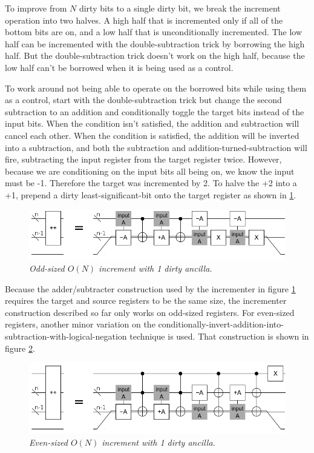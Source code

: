 \documentclass[twocolumn]{article}
\begin{document}
To improve from $N$ dirty bits to a single dirty bit, we break the increment operation into two halves.
A high half that is incremented only if all of the bottom bits are on, and a low half that is unconditionally incremented.
The low half can be incremented with the double-subtraction trick by borrowing the high half.
But the double-subtraction trick doesn't work on the high half, because the low half can't be borrowed when it is being used as a control.

To work around not being able to operate on the borrowed bits while using them as a control, start with the double-subtraction trick but change the second subtraction to an addition and conditionally toggle the target bits instead of the input bits.
When the condition isn't satisfied, the addition and subtraction will cancel each other.
When the condition is satisfied, the addition will be inverted into a subtraction, and both the subtraction and addition-turned-subtraction will fire, subtracting the input register from the target register twice.
However, because we are conditioning on the input bits all being on, we know the input must be -1.
Therefore the target was incremented by 2.
To halve the +2 into a +1, prepend a dirty least-significant-bit onto the target register as shown in \ref{fig:compact-increment}.

\begin{figure}
  \centering
  \includegraphics[totalheight=1.5cm]{compact-increment.png}
  \caption{\em Odd-sized $O(N)$ increment with 1 dirty ancilla.}
  \label{fig:compact-increment}
\end{figure}

Because the adder/subtracter construction used by the incrementer in figure \ref{fig:compact-increment} requires the target and source registers to be the same size, the incrementer construction described so far only works on odd-sized registers.
For even-sized registers, another minor variation on the conditionally-invert-addition-into-subtraction-with-logical-negation technique is used.
That construction is shown in figure \ref{fig:compact-increment-even}.

\begin{figure}
  \centering
  \includegraphics[totalheight=2cm]{compact-increment-even.png}
  \caption{\em Even-sized $O(N)$ increment with 1 dirty ancilla.}
  \label{fig:compact-increment-even}
\end{figure}
\end{document}
